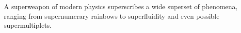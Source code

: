A superweapon of modern physics superscribes a wide superset of phenomena, ranging from supernumerary rainbows to superfluidity and even possible supermultiplets.